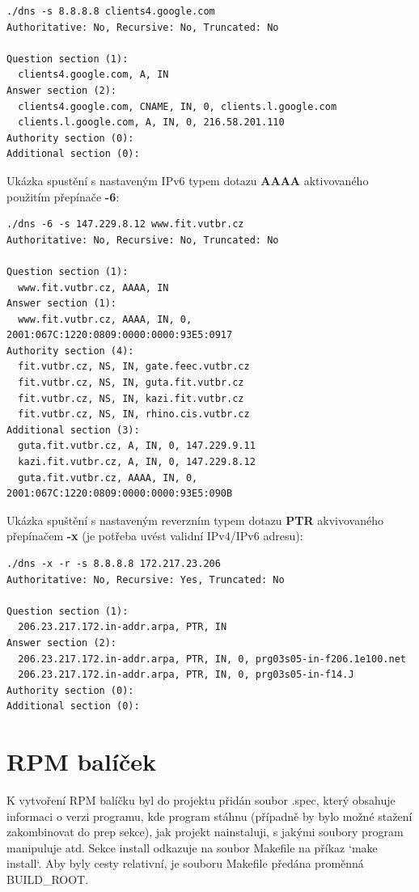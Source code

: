 \documentclass[a4paper,11pt]{article}
\begin{document}
\begin{lstlisting}[frame=single,breaklines]
./dns -s 8.8.8.8 clients4.google.com
Authoritative: No, Recursive: No, Truncated: No

Question section (1):
  clients4.google.com, A, IN
Answer section (2):
  clients4.google.com, CNAME, IN, 0, clients.l.google.com
  clients.l.google.com, A, IN, 0, 216.58.201.110
Authority section (0):
Additional section (0):
\end{lstlisting}

\newpage

Ukázka spustění s nastaveným IPv6 typem dotazu \textbf{AAAA} aktivovaného použitím přepínače \textbf{-6}:

\begin{lstlisting}[frame=single,breaklines]
./dns -6 -s 147.229.8.12 www.fit.vutbr.cz
Authoritative: No, Recursive: No, Truncated: No

Question section (1):
  www.fit.vutbr.cz, AAAA, IN
Answer section (1):
  www.fit.vutbr.cz, AAAA, IN, 0, 2001:067C:1220:0809:0000:0000:93E5:0917
Authority section (4):
  fit.vutbr.cz, NS, IN, gate.feec.vutbr.cz
  fit.vutbr.cz, NS, IN, guta.fit.vutbr.cz
  fit.vutbr.cz, NS, IN, kazi.fit.vutbr.cz
  fit.vutbr.cz, NS, IN, rhino.cis.vutbr.cz
Additional section (3):
  guta.fit.vutbr.cz, A, IN, 0, 147.229.9.11
  kazi.fit.vutbr.cz, A, IN, 0, 147.229.8.12
  guta.fit.vutbr.cz, AAAA, IN, 0, 2001:067C:1220:0809:0000:0000:93E5:090B
\end{lstlisting}

Ukázka spuštění s nastaveným reverzním typem dotazu \textbf{PTR} akvivovaného přepínačem \textbf{-x} (je potřeba uvést validní IPv4/IPv6 adresu):

\begin{lstlisting}[frame=single,breaklines]
./dns -x -r -s 8.8.8.8 172.217.23.206
Authoritative: No, Recursive: Yes, Truncated: No

Question section (1):
  206.23.217.172.in-addr.arpa, PTR, IN
Answer section (2):
  206.23.217.172.in-addr.arpa, PTR, IN, 0, prg03s05-in-f206.1e100.net
  206.23.217.172.in-addr.arpa, PTR, IN, 0, prg03s05-in-f14.J
Authority section (0):
Additional section (0):
\end{lstlisting}

\newpage

\section{RPM balíček}

K vytvoření RPM balíčku byl do projektu přidán soubor .spec, který obsahuje informaci o verzi programu, kde program stáhnu (případně by bylo možné stažení zakombinovat do prep sekce), jak projekt nainstaluji, s jakými soubory program manipuluje atd. Sekce install odkazuje na soubor Makefile na příkaz `make install`. Aby byly cesty relativní, je souboru Makefile předána proměnná BUILD\_ROOT.
\end{document}
